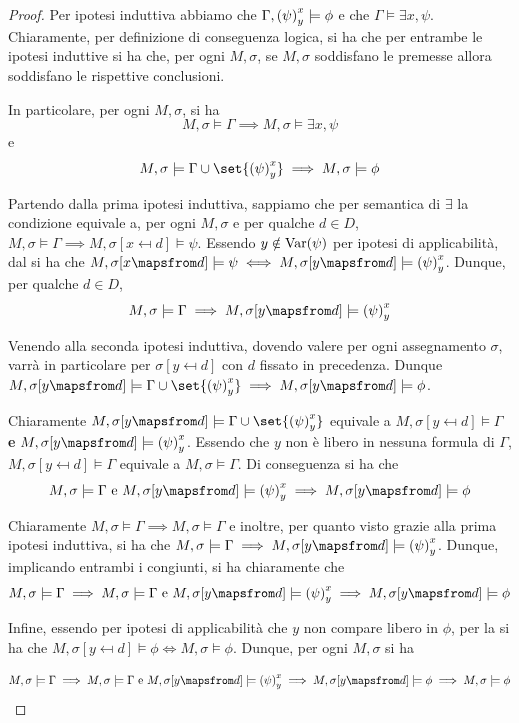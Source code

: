 \begin{proof}
  Per ipotesi induttiva abbiamo che \(\Gamma, {{\left(\psi\right)}^{x}_{y}} \models \phi\) e che \(\Gamma \models \exists x, \psi\). Chiaramente, per definizione di conseguenza logica, si ha che per entrambe le ipotesi induttive si ha che, per ogni \(M,\sigma\), se \(M,\sigma\) soddisfano le premesse allora soddisfano le rispettive conclusioni.

  In particolare, per ogni \(M,\sigma\), si ha
  \[M,\sigma \models \Gamma \implies M,\sigma\models \exists x, \psi\]
  e
  \[M,\sigma\models\Gamma \cup \set{\subs{\psi}{x}{y}} \implies M,\sigma\models \phi \]

  Partendo dalla prima ipotesi induttiva, sappiamo che per semantica di \(\exists\) la condizione equivale a, per ogni \(M,\sigma\) e per qualche \(d \in D\),
  \(M,\sigma \models \Gamma \implies M,\sigma[x\mapsfrom d]\models \psi\). Essendo \(y\notin \operatorname{Var}(\psi)\) per ipotesi di applicabilità, dal  si ha che \(M,\sigma[x\mapsfrom d]\models \psi \iff M,\sigma[y\mapsfrom d]\models \subs{\psi}{x}{y}\). Dunque, per qualche \(d\in D\),
  \[M,\sigma\models \Gamma \implies M,\sigma[y\mapsfrom d]\models \subs{\psi}{x}{y}\]

  Venendo alla seconda ipotesi induttiva, dovendo valere per ogni assegnamento \(\sigma\), varrà in particolare per \(\sigma[y\mapsfrom d]\) con \(d\) fissato in precedenza. Dunque \(M,\sigma[y\mapsfrom d]\models \Gamma \cup \set{\subs{\psi}{x}{y}} \implies M,\sigma[y\mapsfrom d]\models \phi\). 

  Chiaramente \(M,\sigma[y\mapsfrom d]\models \Gamma\cup\set{\subs{\psi}{x}{y}}\) equivale a \(M,\sigma[y\mapsfrom d]\models \Gamma\) \textbf{e} \(M,\sigma[y\mapsfrom d]\models \subs{\psi}{x}{y}\). Essendo che \(y\) non è libero in nessuna formula di \(\Gamma\), \(M,\sigma[y\mapsfrom d]\models \Gamma\) equivale a \(M,\sigma\models \Gamma\).
  Di conseguenza si ha che
  \[M,\sigma\models \Gamma \text{ e } M,\sigma[y\mapsfrom d]\models \subs{\psi}{x}{y} \implies M,\sigma[y\mapsfrom d]\models \phi\]

  Chiaramente \(M,\sigma\models \Gamma \implies M,\sigma\models \Gamma\) e inoltre, per quanto visto grazie alla prima ipotesi induttiva, si ha che \(M,\sigma\models \Gamma \implies M,\sigma[y\mapsfrom d]\models \subs{\psi}{x}{y}\). Dunque, implicando entrambi i congiunti, si ha chiaramente che 
  \[M,\sigma \models \Gamma \implies M,\sigma\models \Gamma \text{ e } M,\sigma[y\mapsfrom d]\models \subs{\psi}{x}{y}\implies M,\sigma[y\mapsfrom d]\models \phi\]

  Infine, essendo per ipotesi di applicabilità che \(y\) non compare libero in \(\phi\), per la  si ha che \(M,\sigma[y\mapsfrom d]\models \phi \iff M,\sigma\models \phi\). Dunque, per ogni \(M,\sigma\) si ha

  \[M,\sigma \models \Gamma \implies M,\sigma\models \Gamma \text{ e } M,\sigma[y\mapsfrom d]\models \subs{\psi}{x}{y}\implies M,\sigma[y\mapsfrom d]\models \phi\implies M,\sigma\models \phi\]

\end{proof}
